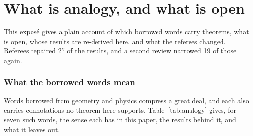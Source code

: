 \section{What is analogy, and what is open}\label{sec:analogy}

This exposé gives a plain account of which borrowed words carry theorems, what is open, whose results are re-derived
here, and what the referees changed. Referees repaired 27 of the \nPropositions{} results, and a second review narrowed
19 of those again.

\subsubsection{What the borrowed words mean}\label{sec:analogy-words}

Words borrowed from geometry and physics compress a great deal, and each also carries connotations no theorem here
supports. Table~\ref{tab:analogy} gives, for seven such words, the sense each has in this paper, the results behind it,
and what it leaves out.

